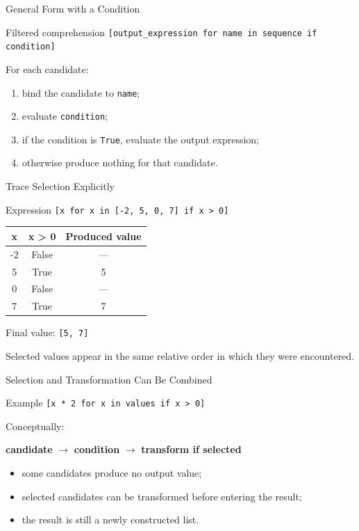 \documentclass[aspectratio=169,10pt]{beamer}
\begin{document}
\begin{frame}{General Form with a Condition}
  \begin{block}{Filtered comprehension}
    \centering
    \texttt{[output\_expression for name in sequence if condition]}
  \end{block}

  For each candidate:
  \begin{enumerate}
    \item bind the candidate to \texttt{name};
    \item evaluate \texttt{condition};
    \item if the condition is \texttt{True}, evaluate the output expression;
    \item otherwise produce nothing for that candidate.
  \end{enumerate}
\end{frame}

\begin{frame}{Trace Selection Explicitly}
  \begin{block}{Expression}
    \centering
    \texttt{[x for x in [-2, 5, 0, 7] if x > 0]}
  \end{block}

  \begin{center}
    \renewcommand{\arraystretch}{1.22}
    \begin{tabular}{c|c|c}
      \textbf{x} & \textbf{x > 0} & \textbf{Produced value} \\\hline
      -2 & False & --- \\
      5 & True & 5 \\
      0 & False & --- \\
      7 & True & 7
    \end{tabular}
  \end{center}

  Final value: \texttt{[5, 7]}

  Selected values appear in the same relative order in which they were encountered.
\end{frame}

\begin{frame}{Selection and Transformation Can Be Combined}
  \begin{block}{Example}
    \centering
    \texttt{[x * 2 for x in values if x > 0]}
  \end{block}

  Conceptually:
  \begin{center}
    \textbf{candidate} $\longrightarrow$ \textbf{condition} $\longrightarrow$ \textbf{transform if selected}
  \end{center}

  \begin{itemize}
    \item some candidates produce no output value;
    \item selected candidates can be transformed before entering the result;
    \item the result is still a newly constructed list.
  \end{itemize}
\end{frame}
\end{document}
